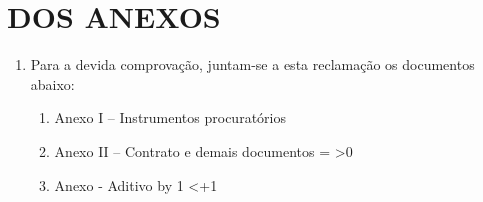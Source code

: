 \section{DOS ANEXOS}

\begin{enumerate}[resume]
\item Para a devida comprovação, juntam-se a esta reclamação os documentos abaixo:
  \begin{enumerate}
    \item Anexo I – Instrumentos procuratórios
    \item Anexo II – Contrato e demais documentos
    \newcount\totalAditivos
    \ifdefined\quantidadeAditivos
      \totalAditivos=\quantidadeAditivos\relax
    \else
      \ifdefined\possuiAditivos
        \ifnum{}
        \fi
      \fi
    \fi
    \ifnum\totalAditivos>0
      \newcount\indiceAditivo
      \loop
        \item Anexo  - Aditivo \number\indiceAditivo
        \advance\indiceAditivo by 1
      \ifnum\indiceAditivo<\numexpr\totalAditivos+1\relax
      \repeat
    \fi
  \end{enumerate}
\end{enumerate}